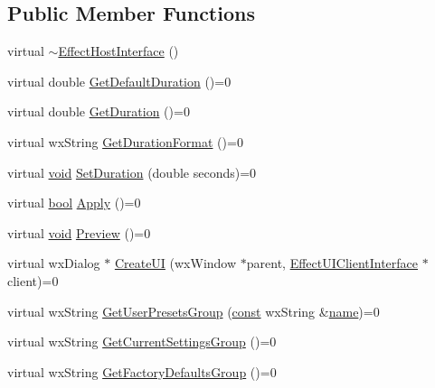 \subsection*{Public Member Functions}
\begin{DoxyCompactItemize}
\item 
virtual \hyperlink{class_effect_host_interface_a27dcadfa141f971c4865c8b4d9d501dd}{$\sim$\+Effect\+Host\+Interface} ()
\item 
virtual double \hyperlink{class_effect_host_interface_a2292c02d10db2e06f035b2a4d5f1ef45}{Get\+Default\+Duration} ()=0
\item 
virtual double \hyperlink{class_effect_host_interface_a54cb70e66b78696c6e82e1e5a71c1e9a}{Get\+Duration} ()=0
\item 
virtual wx\+String \hyperlink{class_effect_host_interface_ad5a1e91c83ee656f80732ff8f45b7d7d}{Get\+Duration\+Format} ()=0
\item 
virtual \hyperlink{sound_8c_ae35f5844602719cf66324f4de2a658b3}{void} \hyperlink{class_effect_host_interface_a2b7dfb9c4d53a2aa8601e476750f2424}{Set\+Duration} (double seconds)=0
\item 
virtual \hyperlink{mac_2config_2i386_2lib-src_2libsoxr_2soxr-config_8h_abb452686968e48b67397da5f97445f5b}{bool} \hyperlink{class_effect_host_interface_aa1982a1bc34e36dc6b89ccc2f1c327f1}{Apply} ()=0
\item 
virtual \hyperlink{sound_8c_ae35f5844602719cf66324f4de2a658b3}{void} \hyperlink{class_effect_host_interface_aaee2b7f0f751900c10d686b3c5d03db8}{Preview} ()=0
\item 
virtual wx\+Dialog $\ast$ \hyperlink{class_effect_host_interface_a811c0b9aa83ed3c99c6ae8fcb9898ed9}{Create\+UI} (wx\+Window $\ast$parent, \hyperlink{class_effect_u_i_client_interface}{Effect\+U\+I\+Client\+Interface} $\ast$client)=0
\item 
virtual wx\+String \hyperlink{class_effect_host_interface_af4340f4345b91c4132de808852be15ed}{Get\+User\+Presets\+Group} (\hyperlink{getopt1_8c_a2c212835823e3c54a8ab6d95c652660e}{const} wx\+String \&\hyperlink{lib_2expat_8h_a1b49b495b59f9e73205b69ad1a2965b0}{name})=0
\item 
virtual wx\+String \hyperlink{class_effect_host_interface_aa7cae047a01410f23008666d4805fb56}{Get\+Current\+Settings\+Group} ()=0
\item 
virtual wx\+String \hyperlink{class_effect_host_interface_a39fe3ab25596fab01a3de1baa5c0a128}{Get\+Factory\+Defaults\+Group} ()=0
\end{DoxyCompactItemize}


